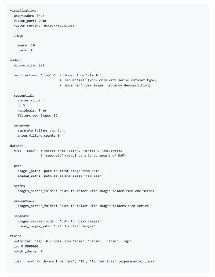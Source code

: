 \begin{figure}[h]
	\centering
	\includegraphics[width=\textwidth]{img/markdown/README_2}
	\label{fig:markdown_2}
\end{figure}

